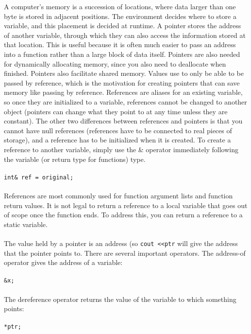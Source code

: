 \documentclass[10pt]{article}
\begin{document}
A computer's memory is a succession of locations, where data larger than one byte is stored in adjacent positions. The environment decides where to store a variable, and this placement is decided at runtime. A pointer stores the address of another variable, through which they can also access the information stored at that location. This is useful because it is often much easier to pass an address into a function rather than a large block of data itself. Pointers are also needed for dynamically allocating memory, since you also  need to deallocate when finished. Pointers also facilitate shared memory. Values use to only be able to be passed by reference, which is the motivation for creating pointers that can save memory like passing by reference. References are aliases for an existing variable, so once they are initialized to a variable, references cannot be changed to another object (pointers can change what they point to at any time unless they are constant). The other two differences between references and pointers is that you cannot have null references (references have to be connected to real pieces of storage), and a reference has to be initialized when it is created. To create a reference to another variable, simply use the \& operator immediately following the variable (or return type for functions) type.\\
\\
\color{red}\texttt{int\& ref = original;}\color{black}\\
\\
References are most commonly used for function argument lists and function return values. It is not legal to return a reference to a local variable that goes out of scope once the function ends. To address this, you can return a reference to a static variable.\\
\\
The value held by a pointer is an address (so \texttt{cout \textless\textless ptr} will give the address that the pointer points to. There are several important operators. The address-of operator gives the address of a variable:\\
\\
\color{red}\texttt{\&x;}\color{black}\\
\\
The dereference operator returns the value of the variable to which something points:\\
\\
\color{red}\texttt{*ptr;}\color{black}\\
\\
\end{document}
